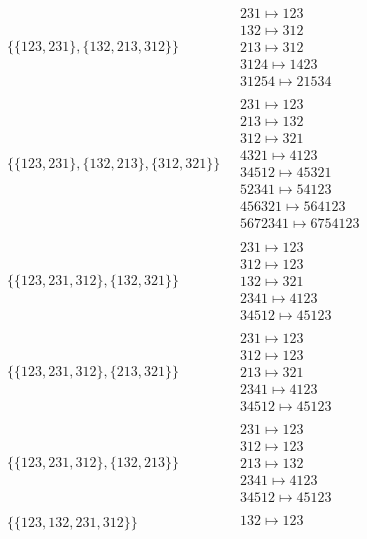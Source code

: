 \begin{scriptsize}
\begin{align}
\{\{123, 231\}, \{132, 213, 312\}\}
\ 
&
\begin{matrix}
231 \mapsto 123
\\
132 \mapsto 312
\\
213 \mapsto 312
\\
3124 \mapsto 1423
\\
31254 \mapsto 21534
\end{matrix}
\\
\{\{123, 231\}, \{132, 213\}, \{312, 321\}\}
\ 
&
\begin{matrix}
231 \mapsto 123
\\
213 \mapsto 132
\\
312 \mapsto 321
\\
4321 \mapsto 4123
\\
34512 \mapsto 45321
\\
52341 \mapsto 54123
\\
456321 \mapsto 564123
\\
5672341 \mapsto 6754123
\end{matrix}
\\
\{\{123, 231, 312\}, \{132, 321\}\}
\ 
&
\begin{matrix}
231 \mapsto 123
\\
312 \mapsto 123
\\
132 \mapsto 321
\\
2341 \mapsto 4123
\\
34512 \mapsto 45123
\end{matrix}
\\
\{\{123, 231, 312\}, \{213, 321\}\}
\ 
&
\begin{matrix}
231 \mapsto 123
\\
312 \mapsto 123
\\
213 \mapsto 321
\\
2341 \mapsto 4123
\\
34512 \mapsto 45123
\end{matrix}
\\
\{\{123, 231, 312\}, \{132, 213\}\}
\ 
&
\begin{matrix}
231 \mapsto 123
\\
312 \mapsto 123
\\
213 \mapsto 132
\\
2341 \mapsto 4123
\\
34512 \mapsto 45123
\end{matrix}
\\
\{\{123, 132, 231, 312\}\}
\ 
&
\begin{matrix}
132 \mapsto 123
\\

\end{matrix}
\end{align}
\end{scriptsize}
